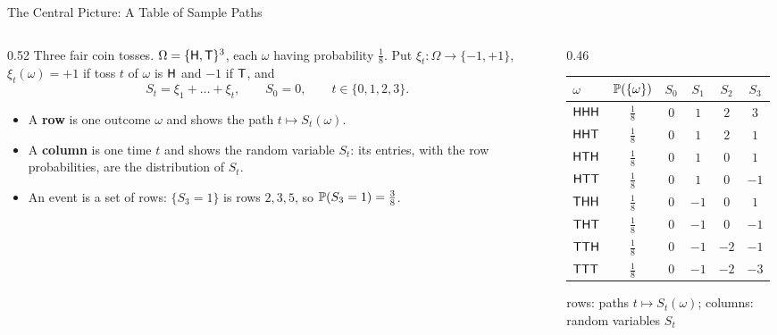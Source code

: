 \begin{frame}{The Central Picture: A Table of Sample Paths}
  \label{fr:table}
  \small
  \begin{columns}[T]
    \begin{column}{0.52\textwidth}
      Three fair coin tosses. $\Omega=\{\mathsf{H},\mathsf{T}\}^3$, each $\omega$ having probability $\tfrac18$. Put $\xi_t\colon\Omega\to\{-1,+1\}$, $\xi_t(\omega)=+1$ if toss $t$ of $\omega$ is $\mathsf{H}$ and $-1$ if $\mathsf{T}$, and
      \[
        S_t=\xi_1+\dots+\xi_t,\qquad S_0=0,\qquad t\in\{0,1,2,3\}.
      \]
      \begin{itemize}
        \item A \textbf{row} is one outcome $\omega$ and shows the path $t\mapsto S_t(\omega)$.
        \item A \textbf{column} is one time $t$ and shows the random variable $S_t$: its entries, with the row probabilities, are the distribution of $S_t$.
        \item An event is a set of rows: $\{S_3=1\}$ is rows $2,3,5$, so $\mathbb{P}(S_3=1)=\tfrac38$.
      \end{itemize}
    \end{column}
    \begin{column}{0.46\textwidth}
      \centering
      \renewcommand{\arraystretch}{1.15}
      \begin{tabular}{@{}lc|cccc@{}}
        \toprule
        $\omega$ & $\mathbb{P}(\{\omega\})$ & $S_0$ & $S_1$ & $S_2$ & $S_3$ \\
        \midrule
        $\mathsf{HHH}$ & $\tfrac18$ & $0$ & $1$ & $2$ & $3$ \\
        $\mathsf{HHT}$ & $\tfrac18$ & $0$ & $1$ & $2$ & $1$ \\
        $\mathsf{HTH}$ & $\tfrac18$ & $0$ & $1$ & $0$ & $1$ \\
        $\mathsf{HTT}$ & $\tfrac18$ & $0$ & $1$ & $0$ & $-1$ \\
        $\mathsf{THH}$ & $\tfrac18$ & $0$ & $-1$ & $0$ & $1$ \\
        $\mathsf{THT}$ & $\tfrac18$ & $0$ & $-1$ & $0$ & $-1$ \\
        $\mathsf{TTH}$ & $\tfrac18$ & $0$ & $-1$ & $-2$ & $-1$ \\
        $\mathsf{TTT}$ & $\tfrac18$ & $0$ & $-1$ & $-2$ & $-3$ \\
        \bottomrule
      \end{tabular}
      \par\medskip
      {\footnotesize rows: paths $t\mapsto S_t(\omega)$; \quad columns: random variables $S_t$}
    \end{column}
  \end{columns}
\end{frame}

